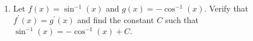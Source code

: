 \documentclass[12pt]{article}
\newif\ifans
\begin{document}
\begin{enumerate}
\begin{enumerate}
\ifans{\fbox{\parbox{1\linewidth}{Define $h(x)=g(x)-f(x)$.  Then, for all $x$ in the interval $I$,
$$h^{\prime}(x)=g^{\prime}(x)-f^{\prime}(x)=0$$
By problem 7, we know that $h(x)=C$ for some constant $C$. And, it follows that $g(x)=f(x)+C$.
}}} \fi

\newpage

\item Let $f(x)=\sin^{-1}(x)$ and $g(x)=-\cos^{-1}(x)$.  Verify that $f^{\prime}(x)=g^{\prime}(x)$ and find the constant $C$ such that $\sin^{-1}(x)=-\cos^{-1}(x)+C$.

\ifans{\fbox{\parbox{1\linewidth}{\begin{center}$f^{\prime}(x)=g^{\prime}(x)=\frac{1}{\sqrt{1-x^2}}$\\
$\sin^{-1}(x)=-\cos^{-1}(x)+\frac{\pi}{2}$ for all $x$ in $[-1,1]$
\texttt{[image: antiderivative.pdf]}
\end{center}}}} \fi

\end{enumerate}

\end{enumerate}
\end{document}
